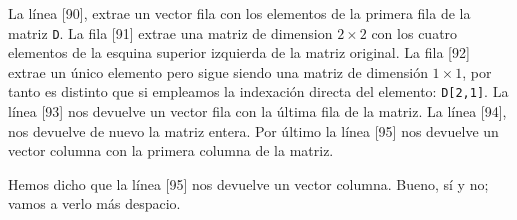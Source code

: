 \begin{paracol}{2}
La línea [90], extrae un vector fila con los elementos de la primera fila de la matriz \texttt{D}. La fila [91] extrae una matriz de dimension $2\times 2$ con los cuatro elementos de la esquina superior izquierda de la matriz original. La fila [92] extrae un único elemento pero sigue siendo una matriz de dimensión $1 \times 1$, por tanto es distinto que si empleamos la indexación directa del elemento: \texttt{D[2,1]}. La línea [93] nos devuelve un vector fila con la última fila de la matriz. La línea [94], nos devuelve de nuevo la matriz entera. Por último la línea [95] nos devuelve un vector columna con la primera columna de la matriz.

Hemos dicho que la línea [95] nos devuelve un vector columna. Bueno, sí y no; vamos a verlo más despacio.


\end{paracol}
